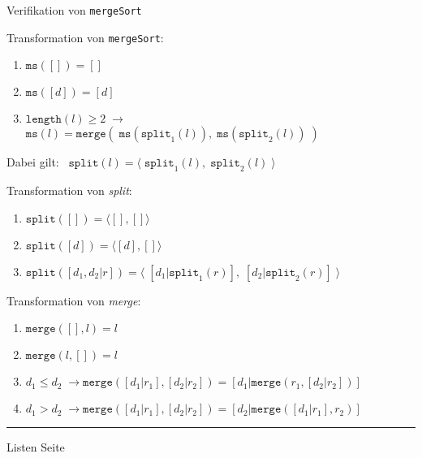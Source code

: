 \begin{slide}{}
\normalsize

\begin{center}
Verifikation von \texttt{mergeSort}
\end{center}
\vspace*{0.5cm}

\footnotesize
Transformation von \texttt{mergeSort}:
\begin{enumerate}
\item $\mathtt{ms}([]) = []$
\item $\mathtt{ms}([d]) = [d]$
\item $\mathtt{length}(l) \geq 2 \;\rightarrow$ \\[0.3cm]
      $\mathtt{ms}(l) = \mathtt{merge}(\;\mathtt{ms}(\mathtt{split}_1(l)),\; \mathtt{ms}(\mathtt{split}_2(l))\;)$ 
\end{enumerate}
Dabei gilt: \  $ \mathtt{split}(l) = \langle\; \mathtt{split}_1(l), \;\mathtt{split}_2(l) \;\rangle$

Transformation von \textsl{split}:
\begin{enumerate}
\item $\texttt{split}([]) = \langle [], [] \rangle$
\item $\texttt{split}([d]) = \langle [d], [] \rangle$
\item $\texttt{split}([d_1,d_2|r]) = \langle\; [d_1|\mathtt{split}_1(r)],\; [d_2|\mathtt{split}_2(r)] \;\rangle$
\end{enumerate}

Transformation von \textsl{merge}:
\begin{enumerate}
\item $\texttt{merge}([],l) = l$
\item $\texttt{merge}(l,[]) = l$
\item $d_1 \leq d_2 \;\rightarrow \mathtt{merge}([d_1|r_1], [d_2|r_2]) = [d_1| \mathtt{merge}(r_1, [d_2|r_2])]$
\item $d_1 > d_2 \;\rightarrow \mathtt{merge}([d_1|r_1], [d_2|r_2]) = [d_2 | \mathtt{merge}([d_1 | r_1], r_2)]$
\end{enumerate}

\vspace*{\fill}
\tiny \addtocounter{mypage}{1}
\rule{17cm}{1mm}
Listen  \hspace*{\fill} Seite 
\end{slide}


